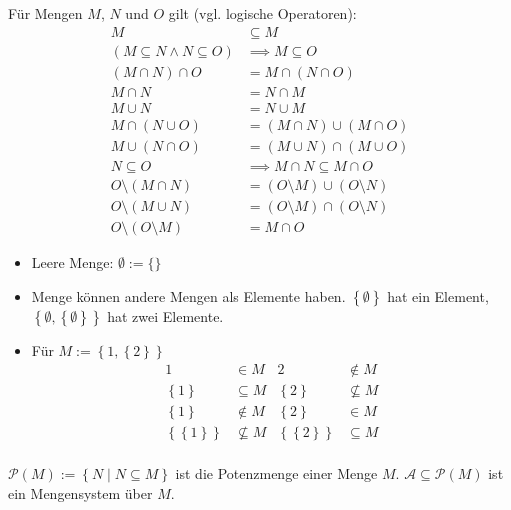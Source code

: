 \begin{theorem}
  Für Mengen $M$, $N$ und $O$ gilt (vgl. logische Operatoren):
  \begin{align*}
    M &\subseteq M\\
    (M \subseteq N \wedge N \subseteq O) &\implies M \subseteq O\\
    (M \cap N) \cap O &= M \cap (N \cap O) \\
    M \cap N &= N \cap M\\
    M \cup N &= N \cup M\\
    M \cap (N \cup O) &= (M \cap N) \cup (M \cap O)\\
    M \cup (N \cap O) &= (M \cup N) \cap (M \cup O)\\
    N \subseteq O &\implies M \cap N \subseteq M \cap O \\
    O \setminus (M \cap N) &= (O \setminus M) \cup (O \setminus N) \\
    O \setminus (M \cup N) &= (O \setminus M) \cap (O \setminus N) \\
    O \setminus (O \setminus M) &= M \cap O
  \end{align*}
\end{theorem}

\begin{remark}
  \begin{itemize}
  \item Leere Menge: $\emptyset := \{\}$\index[sym]{$\emptyset$}
  \item Menge können andere Mengen als Elemente haben. $\left\{ \emptyset \right\}$ hat ein Element, $\left\{ \emptyset, \left\{ \emptyset \right\} \right\}$ hat zwei Elemente.
  \item Für $M:= \left\{ 1, \left\{ 2 \right\} \right\}$
    \begin{align*}
      1 &\in M & 2 &\not\in M \\
      \left\{ 1 \right\} &\subseteq M & \left\{ 2 \right\} &\not\subseteq M \\
      \left\{ 1 \right\} &\not\in M & \left\{ 2 \right\} &\in M \\
      \left\{ \left\{ 1 \right\} \right\} &\not\subseteq M & \left\{ \left\{ 2 \right\} \right\} &\subseteq M \\
    \end{align*}
  \end{itemize}
\end{remark}

\begin{definition}[Potenzmenge]
  $\mathscr{P}(M) := \left\{ N \middle| N \subseteq M \right\}$ ist die Potenzmenge einer Menge $M$. $\mathscr{A} \subseteq \mathscr{P}(M)$ ist ein Mengensystem über $M$.
\end{definition}

